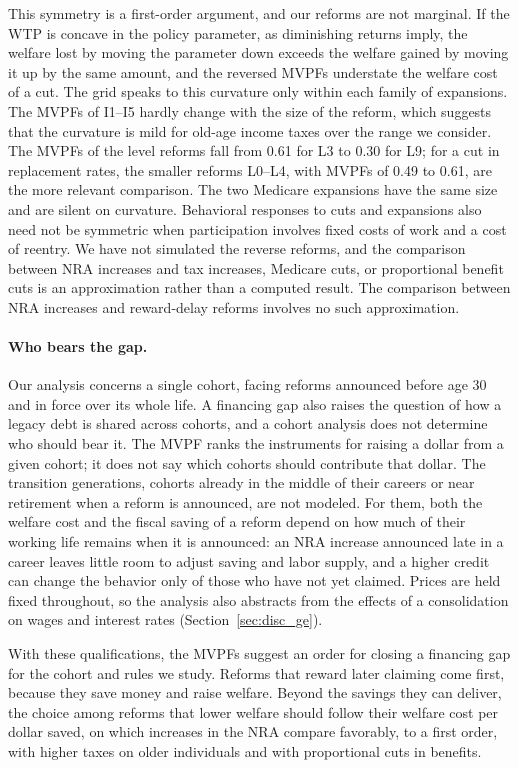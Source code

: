 This symmetry is a first-order argument, and our reforms are not marginal. If the WTP is concave in the policy parameter, as diminishing returns imply, the welfare lost by moving the parameter down exceeds the welfare gained by moving it up by the same amount, and the reversed MVPFs understate the welfare cost of a cut. The grid speaks to this curvature only within each family of expansions. The MVPFs of I1--I5 hardly change with the size of the reform, which suggests that the curvature is mild for old-age income taxes over the range we consider. The MVPFs of the level reforms fall from 0.61 for L3 to 0.30 for L9; for a cut in replacement rates, the smaller reforms L0--L4, with MVPFs of 0.49 to 0.61, are the more relevant comparison. The two Medicare expansions have the same size and are silent on curvature. Behavioral responses to cuts and expansions also need not be symmetric when participation involves fixed costs of work and a cost of reentry. We have not simulated the reverse reforms, and the comparison between NRA increases and tax increases, Medicare cuts, or proportional benefit cuts is an approximation rather than a computed result. The comparison between NRA increases and reward-delay reforms involves no such approximation.

\paragraph{Who bears the gap.} Our analysis concerns a single cohort, facing reforms announced before age 30 and in force over its whole life. A financing gap also raises the question of how a legacy debt is shared across cohorts, and a cohort analysis does not determine who should bear it. The MVPF ranks the instruments for raising a dollar from a given cohort; it does not say which cohorts should contribute that dollar. The transition generations, cohorts already in the middle of their careers or near retirement when a reform is announced, are not modeled. For them, both the welfare cost and the fiscal saving of a reform depend on how much of their working life remains when it is announced: an NRA increase announced late in a career leaves little room to adjust saving and labor supply, and a higher credit can change the behavior only of those who have not yet claimed. Prices are held fixed throughout, so the analysis also abstracts from the effects of a consolidation on wages and interest rates (Section~\ref{sec:disc_ge}).

With these qualifications, the MVPFs suggest an order for closing a financing gap for the cohort and rules we study. Reforms that reward later claiming come first, because they save money and raise welfare. Beyond the savings they can deliver, the choice among reforms that lower welfare should follow their welfare cost per dollar saved, on which increases in the NRA compare favorably, to a first order, with higher taxes on older individuals and with proportional cuts in benefits.
